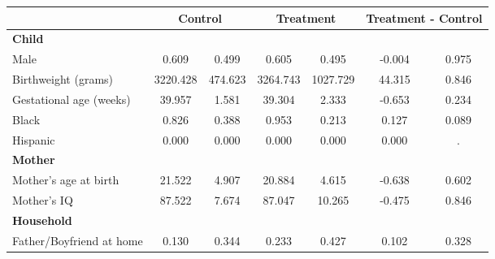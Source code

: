 \begin{tabular}{lcccccc}
\toprule
& \multicolumn{2}{c}{Control} & \multicolumn{2}{c}{Treatment} & \multicolumn{2}{c}{Treatment - Control} \\
\midrule
\textbf{Child} & & & & & & \\
\quad\quad Male & 0.609 & 0.499 & 0.605 & 0.495 & -0.004 & 0.975 \\
\quad\quad Birthweight (grams) & 3220.428 & 474.623 & 3264.743 & 1027.729 & 44.315 & 0.846 \\
\quad\quad Gestational age (weeks) & 39.957 & 1.581 & 39.304 & 2.333 & -0.653 & 0.234 \\
\quad\quad Black & 0.826 & 0.388 & 0.953 & 0.213 & 0.127 & 0.089 \\
\quad\quad Hispanic & 0.000 & 0.000 & 0.000 & 0.000 & 0.000 & . \\
\textbf{Mother} & & & & & & \\
\quad\quad Mother's age at birth & 21.522 & 4.907 & 20.884 & 4.615 & -0.638 & 0.602 \\
\quad\quad Mother's IQ & 87.522 & 7.674 & 87.047 & 10.265 & -0.475 & 0.846 \\
\textbf{Household} & & & & & & \\
\quad\quad Father/Boyfriend at home & 0.130 & 0.344 & 0.233 & 0.427 & 0.102 & 0.328 \\
\bottomrule
\end{tabular}
